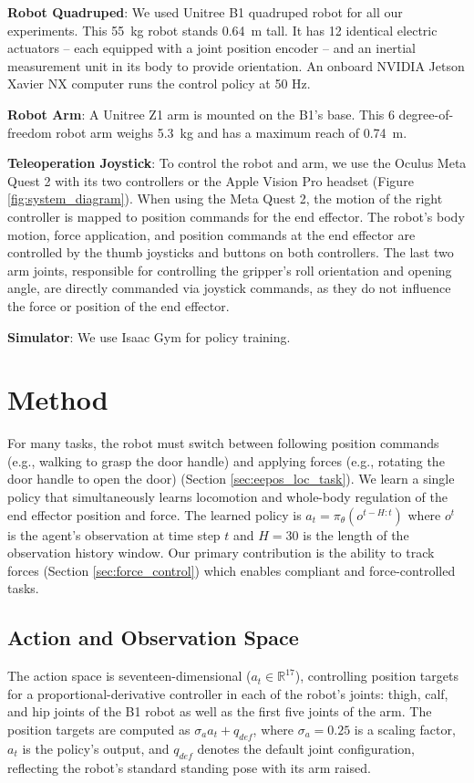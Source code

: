 \textbf{Robot Quadruped}: We used Unitree B1 quadruped robot for all our experiments. This \SI{55}{\kilo\gram} robot stands \SI{0.64}{\meter} tall. It has \SI{12}{} identical electric actuators -- each equipped with a joint position encoder -- and an inertial measurement unit in its body to provide orientation. An onboard NVIDIA Jetson Xavier NX computer runs the control policy at 50 Hz.

\textbf{Robot Arm}: A Unitree Z1 arm is mounted on the B1's base. This \SI{6}{} degree-of-freedom robot arm weighs \SI{5.3}{\kilo\gram} and has a maximum reach of \SI{0.74}{\meter}.

\textbf{Teleoperation Joystick}: To control the robot and arm, we use the Oculus Meta Quest 2 with its two controllers or the Apple Vision Pro headset  (Figure \ref{fig:system_diagram}). When using the Meta Quest 2, the motion of the right controller is mapped to position commands for the end effector. The robot's body motion, force application, and position commands at the end effector are controlled by the thumb joysticks and buttons on both controllers. The last two arm joints, responsible for controlling the gripper's roll orientation and opening angle, are directly commanded via joystick commands, as they do not influence the force or position of the end effector. 

\textbf{Simulator}: We use Isaac Gym \cite{isaacGym} for policy training.

\section{Method}
\label{sec:method}
For many tasks, the robot must switch between following position commands (e.g., walking to grasp the door handle) and applying forces (e.g., rotating the door handle to open the door) (Section \ref{sec:eepos_loc_task}). We learn a single policy that simultaneously learns locomotion and whole-body regulation of the end effector position and force. The learned policy is $a_t = \pi_{\theta}(o^{t-H:t})$ where $o^t$ is the agent's observation at time step $t$ and $H=30$ is the length of the observation history window.
Our primary contribution is the ability to track forces (Section \ref{sec:force_control}) which enables compliant and force-controlled tasks. 

\subsection{Action and Observation Space}
\label{sec:actobs}
The action space is seventeen-dimensional ($a_t \in \mathbb{R}^{17}$), controlling position targets for a proportional-derivative controller in each of the robot's joints: thigh, calf, and hip joints of the B1 robot as well as the first five joints of the arm.
The position targets are computed as $\sigma_a a_t + q_{def}$, where $\sigma_a = 0.25$ is a scaling factor, $a_t$ is the policy’s output, and $q_{def}$ denotes the default joint configuration, reflecting the robot's standard standing pose with its arm raised. 

